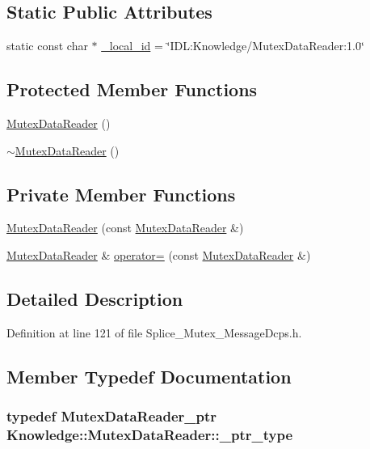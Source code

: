 \subsection*{Static Public Attributes}
\begin{DoxyCompactItemize}
\item 
static const char $\ast$ \hyperlink{classKnowledge_1_1MutexDataReader_a56c9eccd6ba3fbadffbd33762682479a}{\_\-local\_\-id} = \char`\"{}IDL:Knowledge/MutexDataReader:1.0\char`\"{}
\end{DoxyCompactItemize}
\subsection*{Protected Member Functions}
\begin{DoxyCompactItemize}
\item 
\hyperlink{classKnowledge_1_1MutexDataReader_a2d13c8ba3d0d1973b118565003f21921}{MutexDataReader} ()
\item 
\hyperlink{classKnowledge_1_1MutexDataReader_a203607d2241727953f71f0cc901bc367}{$\sim$MutexDataReader} ()
\end{DoxyCompactItemize}
\subsection*{Private Member Functions}
\begin{DoxyCompactItemize}
\item 
\hyperlink{classKnowledge_1_1MutexDataReader_a1212791d27e2ba45323e917c3c8ce23c}{MutexDataReader} (const \hyperlink{classKnowledge_1_1MutexDataReader}{MutexDataReader} \&)
\item 
\hyperlink{classKnowledge_1_1MutexDataReader}{MutexDataReader} \& \hyperlink{classKnowledge_1_1MutexDataReader_a0ead370e9a1f61c21c5d23a9da783054}{operator=} (const \hyperlink{classKnowledge_1_1MutexDataReader}{MutexDataReader} \&)
\end{DoxyCompactItemize}


\subsection{Detailed Description}


Definition at line 121 of file Splice\_\-Mutex\_\-MessageDcps.h.



\subsection{Member Typedef Documentation}
\hypertarget{classKnowledge_1_1MutexDataReader_a6ce4984d18dc73062308b9481f58d1d9}{
\subsubsection[{\_\-ptr\_\-type}]{\setlength{\rightskip}{0pt plus 5cm}typedef {\bf MutexDataReader\_\-ptr} {\bf Knowledge::MutexDataReader::\_\-ptr\_\-type}}}
\label{dc/d57/classKnowledge_1_1MutexDataReader_a6ce4984d18dc73062308b9481f58d1d9}


